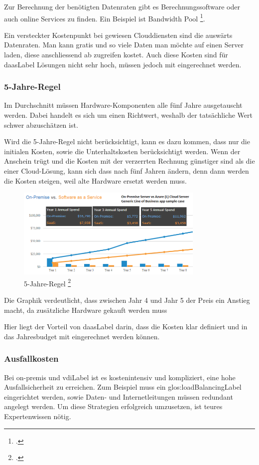 Zur Berechnung der benötigten Datenraten gibt es Berechnungssoftware oder auch online Services zu finden. Ein Beispiel ist Bandwidth Pool \footcite{What_is_Bandwidth_Pool_Bandwidth_Pool_2014-12-22}.

Ein versteckter Kostenpunkt bei gewiesen Clouddiensten sind die auswärts Datenraten. Man kann gratis und so viele Daten man möchte auf einen Server laden, diese anschliessend ab zugreifen kostet.
Auch diese Kosten sind für \Gls{daasLabel} Lösungen nicht sehr hoch, müssen jedoch mit eingerechnet werden.

\subsubsection{5-Jahre-Regel}
Im Durchschnitt müssen Hardware-Komponenten alle fünf Jahre ausgetauscht werden. Dabei handelt es sich um einen Richtwert, weshalb der tatsächliche Wert schwer abzuschätzen ist.

Wird die 5-Jahre-Regel nicht berücksichtigt, kann es dazu kommen, dass nur die initialen Kosten, sowie die Unterhaltskosten berücksichtigt werden.
Wenn der Anschein trügt und die Kosten mit der verzerrten Rechnung günstiger sind als die einer Cloud-Lösung, kann sich dass nach fünf Jahren ändern, denn dann werden die Kosten steigen, weil alte Hardware ersetzt werden muss.

\begin{figure}[H]
	\includegraphics[width=0.8\textwidth]{images/five-year-rule}
	\caption{5-Jahre-Regel \footcite{Comparing_cloud_vs_on-premise_Six_hidden_costs_people_always_forget_about}}
	\label{fig:fiveYearRuleImage}
\end{figure}
Die Graphik verdeutlicht, dass zwischen Jahr 4 und Jahr 5 der Preis ein Anstieg macht, da zusätzliche Hardware gekauft werden muss

Hier liegt der Vorteil von \Gls{daasLabel} darin, dass die Kosten klar definiert und in das Jahresbudget mit eingerechnet werden können.

\subsubsection{Ausfallkosten}
Bei on-premis und \Gls{vdiLabel} ist es kostenintensiv und kompliziert, eine hohe Ausfallsicherheit zu erreichen. Zum Beispiel muss ein \gls{glos:loadBalancingLabel} eingerichtet werden, sowie Daten- und Internetleitungen müssen redundant angelegt werden. Um diese Strategien erfolgreich umzusetzen, ist teures Expertenwissen nötig.

